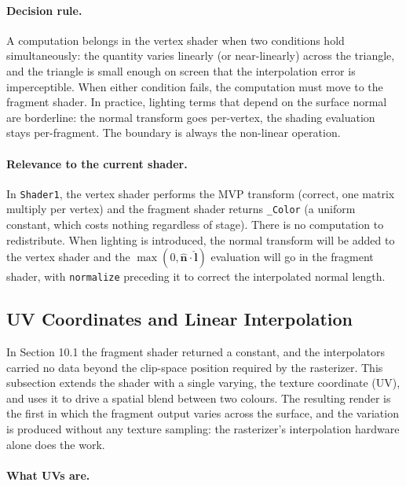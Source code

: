 \documentclass[11pt]{article}
\begin{document}
\paragraph{Decision rule.}

A computation belongs in the vertex shader when two conditions hold simultaneously: the quantity varies linearly (or near-linearly) across the triangle, and the triangle is small enough on screen that the interpolation error is imperceptible. When either condition fails, the computation must move to the fragment shader. In practice, lighting terms that depend on the surface normal are borderline: the normal transform goes per-vertex, the shading evaluation stays per-fragment. The boundary is always the non-linear operation.

\paragraph{Relevance to the current shader.}

In \texttt{Shader1}, the vertex shader performs the MVP transform (correct, one matrix multiply per vertex) and the fragment shader returns \texttt{\_Color} (a uniform constant, which costs nothing regardless of stage). There is no computation to redistribute. When lighting is introduced, the normal transform will be added to the vertex shader and the $\max(0, \hat{\mathbf{n}} \cdot \hat{\mathbf{l}})$ evaluation will go in the fragment shader, with \texttt{normalize} preceding it to correct the interpolated normal length.


\subsection{UV Coordinates and Linear Interpolation}

In Section 10.1 the fragment shader returned a constant, and the interpolators carried no data beyond the clip-space position required by the rasterizer. This subsection extends the shader with a single varying, the texture coordinate (UV), and uses it to drive a spatial blend between two colours. The resulting render is the first in which the fragment output varies across the surface, and the variation is produced without any texture sampling: the rasterizer's interpolation hardware alone does the work.

\paragraph{What UVs are.}
\end{document}
